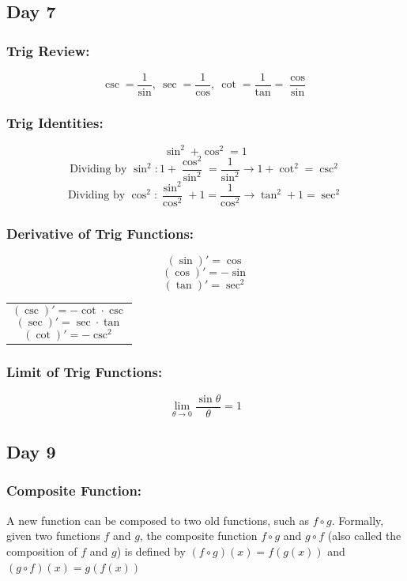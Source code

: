 \documentclass[12pt]{article}
\begin{document}
\subsection{Day 7}
\subsubsection{Trig Review:}
$$\csc = \frac{1}{\sin}, \ \sec = \frac{1}{\cos}, \ \cot = \frac{1}{\tan} = \frac{\cos}{\sin}$$
\subsubsection{Trig Identities:}
$$\sin^2 + \cos^2 = 1$$
$$\text{Dividing by }\sin^2: 1 + \frac{\cos^2}{\sin^2} = \frac{1}{\sin^2} \rightarrow{} 1 + \cot^2 = \csc^2$$
$$\text{Dividing by }\cos^2: \frac{\sin^2}{\cos^2} + 1 = \frac{1}{\cos^2} \rightarrow{} \tan^2 + 1 = \sec^2$$
\subsubsection{Derivative of Trig Functions:}
\begin{minipage}{0.5\textwidth}
    
    $$(\sin)' = \cos$$
    $$(\cos)' = -\sin$$
    $$(\tan)' = \sec^2 $$
\hfil
\end{minipage}
\begin{minipage}{0.45\textwidth}
\begin{tabular}{|p{\textwidth}}

    $$(\csc)' = -\cot \cdot \csc$$
    $$(\sec)' = \sec \cdot \tan$$
    $$(\cot)' = -\csc^2 $$

\end{tabular}
\end{minipage}

\subsubsection{Limit of Trig Functions:}

$$\lim_{\theta \to 0}{\frac{\sin \theta}{\theta}} = 1$$


\subsection{Day 9}
\subsubsection{Composite Function: } A new function can be  composed to two old functions, such as $f \circ g$. Formally, given two functions $f$ and $g$, the composite function $f \circ g$ and $g \circ f$ (also called the composition of $f$ and $g$) is defined by $(f \circ g)(x)  = f(g(x))$ and $(g \circ f)(x)  = g(f(x))$
\end{document}
